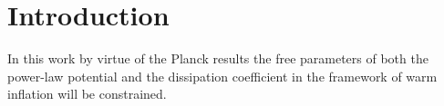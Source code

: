 \documentclass[12pt]{revtex4}
\begin{document}
\maketitle






\section{Introduction}\label{secintro}
In this work by virtue of the Planck results \cite{Ade:2013ktc,Ade:2013uln,Ade:2013ydc,Planck2015,Planck2018} the free parameters of  both the  power-law potential and   the dissipation coefficient in the framework of warm inflation will be constrained.\\
\end{document}
